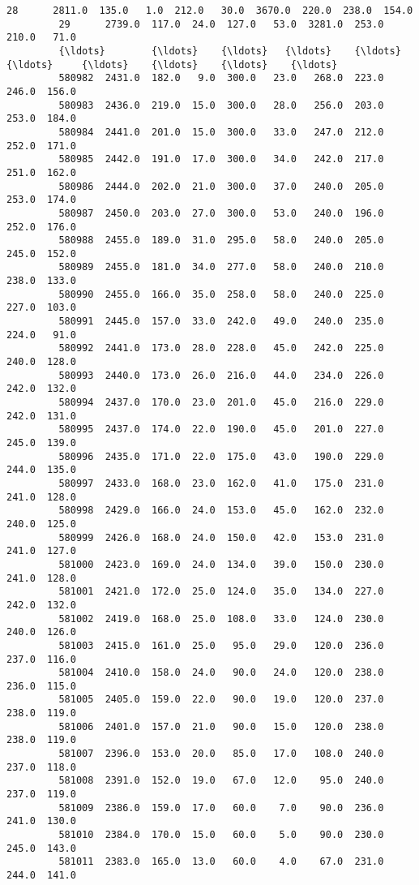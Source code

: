 \documentclass[11pt]{article}
\begin{document}
\begin{Verbatim}[commandchars=\\\{\}]
         28      2811.0  135.0   1.0  212.0   30.0  3670.0  220.0  238.0  154.0   
         29      2739.0  117.0  24.0  127.0   53.0  3281.0  253.0  210.0   71.0   
         {\ldots}        {\ldots}    {\ldots}   {\ldots}    {\ldots}    {\ldots}     {\ldots}    {\ldots}    {\ldots}    {\ldots}   
         580982  2431.0  182.0   9.0  300.0   23.0   268.0  223.0  246.0  156.0   
         580983  2436.0  219.0  15.0  300.0   28.0   256.0  203.0  253.0  184.0   
         580984  2441.0  201.0  15.0  300.0   33.0   247.0  212.0  252.0  171.0   
         580985  2442.0  191.0  17.0  300.0   34.0   242.0  217.0  251.0  162.0   
         580986  2444.0  202.0  21.0  300.0   37.0   240.0  205.0  253.0  174.0   
         580987  2450.0  203.0  27.0  300.0   53.0   240.0  196.0  252.0  176.0   
         580988  2455.0  189.0  31.0  295.0   58.0   240.0  205.0  245.0  152.0   
         580989  2455.0  181.0  34.0  277.0   58.0   240.0  210.0  238.0  133.0   
         580990  2455.0  166.0  35.0  258.0   58.0   240.0  225.0  227.0  103.0   
         580991  2445.0  157.0  33.0  242.0   49.0   240.0  235.0  224.0   91.0   
         580992  2441.0  173.0  28.0  228.0   45.0   242.0  225.0  240.0  128.0   
         580993  2440.0  173.0  26.0  216.0   44.0   234.0  226.0  242.0  132.0   
         580994  2437.0  170.0  23.0  201.0   45.0   216.0  229.0  242.0  131.0   
         580995  2437.0  174.0  22.0  190.0   45.0   201.0  227.0  245.0  139.0   
         580996  2435.0  171.0  22.0  175.0   43.0   190.0  229.0  244.0  135.0   
         580997  2433.0  168.0  23.0  162.0   41.0   175.0  231.0  241.0  128.0   
         580998  2429.0  166.0  24.0  153.0   45.0   162.0  232.0  240.0  125.0   
         580999  2426.0  168.0  24.0  150.0   42.0   153.0  231.0  241.0  127.0   
         581000  2423.0  169.0  24.0  134.0   39.0   150.0  230.0  241.0  128.0   
         581001  2421.0  172.0  25.0  124.0   35.0   134.0  227.0  242.0  132.0   
         581002  2419.0  168.0  25.0  108.0   33.0   124.0  230.0  240.0  126.0   
         581003  2415.0  161.0  25.0   95.0   29.0   120.0  236.0  237.0  116.0   
         581004  2410.0  158.0  24.0   90.0   24.0   120.0  238.0  236.0  115.0   
         581005  2405.0  159.0  22.0   90.0   19.0   120.0  237.0  238.0  119.0   
         581006  2401.0  157.0  21.0   90.0   15.0   120.0  238.0  238.0  119.0   
         581007  2396.0  153.0  20.0   85.0   17.0   108.0  240.0  237.0  118.0   
         581008  2391.0  152.0  19.0   67.0   12.0    95.0  240.0  237.0  119.0   
         581009  2386.0  159.0  17.0   60.0    7.0    90.0  236.0  241.0  130.0   
         581010  2384.0  170.0  15.0   60.0    5.0    90.0  230.0  245.0  143.0   
         581011  2383.0  165.0  13.0   60.0    4.0    67.0  231.0  244.0  141.0   
         

\end{Verbatim}
\end{document}

